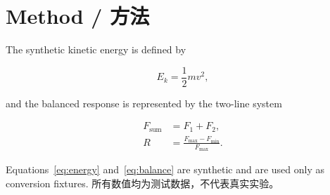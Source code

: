 \section{Method / 方法}
\label{sec:methods}

The synthetic kinetic energy is defined by

\begin{equation}
  E_k = \frac{1}{2} m v^2,
  \label{eq:energy}
\end{equation}

and the balanced response is represented by the two-line system

\begin{align}
  F_{\mathrm{sum}} &= F_1 + F_2, \\
  R &= \frac{F_{\max}-F_{\min}}{F_{\max}}.
  \label{eq:balance}
\end{align}

Equations~\eqref{eq:energy} and~\eqref{eq:balance} are synthetic and are used
only as conversion fixtures. 所有数值均为测试数据，不代表真实实验。
